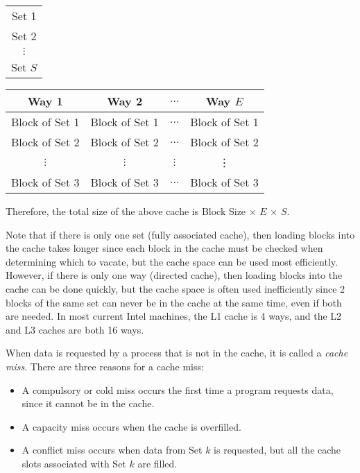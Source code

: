 \documentclass[12pt]{article}
\begin{document}
\begin{center}
\begin{tabular}{c}
 \\
Set 1 \\
Set 2 \\
$\vdots$\\
Set $S$ \\
\end{tabular}
\begin{tabular}{|c|c|c|c|}
 \multicolumn{1}{c}{Way 1} & \multicolumn{1}{c}{Way 2} & \multicolumn{1}{c}{$\ldots$} & \multicolumn{1}{c}{Way $E$} \\
\hline
Block of Set 1 & Block of Set 1 & $\ldots$ & Block of Set 1\\
\hline
Block of Set 2 & Block of Set 2& $\ldots$ & Block of Set 2\\
\hline
$\vdots$ & $\vdots$ & $\vdots$ & \vdots \\
\hline
Block of Set 3 & Block of Set 3 & $\ldots$ & Block of Set 3\\
\hline
\end{tabular}
\end{center}

Therefore, the total size of the above cache is
Block Size $\times$ $E$ $\times$ $S$.

Note that if there is only one set (fully associated cache), then loading 
blocks into the cache takes longer since each block in the cache must be checked
when determining which to vacate, but the cache space can be used most 
efficiently.
However, if there is only one way (directed cache), then loading blocks into
the cache can be done quickly, but the cache space is often used inefficiently
since 2 blocks of the same set can never be in the cache at the same time, even
if both are needed.
In most current Intel machines, the L1 cache is 4 ways, and the L2 and L3 
caches are both 16 ways.

When data is requested by a process that is not in the cache, it is called a
{\it cache miss}.
There are three reasons for a cache miss:
\begin{itemize}
\item A compulsory or cold miss occurs the first time a program requests data,
since it cannot be in the cache.
\item A capacity miss occurs when the cache is overfilled.
\item A conflict miss occurs when data from Set $k$ is requested, but all the
cache slots associated with Set $k$ are filled.
\end{itemize}
\end{document}
